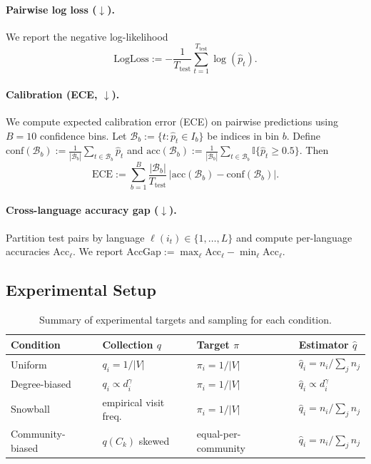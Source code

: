 \documentclass{article}
\theoremstyle{plain}
\theoremstyle{definition}
\theoremstyle{remark}
\begin{document}
\paragraph{Pairwise log loss ($\downarrow$).}
We report the negative log-likelihood
\begin{equation}
\mathrm{LogLoss} := -\frac{1}{T_{\text{test}}}\sum_{t=1}^{T_{\text{test}}}\log(\hat p_t).
\end{equation}

\paragraph{Calibration (ECE, $\downarrow$).}
We compute expected calibration error (ECE) on pairwise predictions using $B=10$
confidence bins. Let $\mathcal{B}_b:=\{t:\hat p_t\in I_b\}$ be indices in bin $b$.
Define $\mathrm{conf}(\mathcal{B}_b):=\frac{1}{|\mathcal{B}_b|}\sum_{t\in\mathcal{B}_b}\hat p_t$
and $\mathrm{acc}(\mathcal{B}_b):=\frac{1}{|\mathcal{B}_b|}\sum_{t\in\mathcal{B}_b}\mathbb{I}\{\hat p_t\ge 0.5\}$.
Then
\begin{equation}
\mathrm{ECE}:=\sum_{b=1}^B \frac{|\mathcal{B}_b|}{T_{\text{test}}}\,\big|\mathrm{acc}(\mathcal{B}_b)-\mathrm{conf}(\mathcal{B}_b)\big|.
\end{equation}

\paragraph{Cross-language accuracy gap ($\downarrow$).}
Partition test pairs by language $\ell(i_t)\in\{1,\dots,L\}$ and compute
per-language accuracies $\mathrm{Acc}_\ell$. We report $\mathrm{AccGap}:=\max_\ell \mathrm{Acc}_\ell-\min_\ell \mathrm{Acc}_\ell$.

\subsection{Experimental Setup}

\begin{table}[h]
\caption{Summary of experimental targets and sampling for each condition.}
\label{tab:exp-setup}
\centering
\small
\begin{tabular}{llll}
\toprule
\textbf{Condition} & \textbf{Collection $q$} & \textbf{Target $\pi$} & \textbf{Estimator $\hat q$} \\
\midrule
Uniform & $q_i = 1/|V|$ & $\pi_i = 1/|V|$ & $\hat q_i = n_i/\sum_j n_j$ \\
Degree-biased & $q_i \propto d_i^\gamma$ & $\pi_i = 1/|V|$ & $\hat q_i \propto d_i^\gamma$ \\
Snowball & empirical visit freq. & $\pi_i = 1/|V|$ & $\hat q_i = n_i/\sum_j n_j$ \\
Community-biased & $q(C_k)$ skewed & equal-per-community & $\hat q_i = n_i/\sum_j n_j$ \\
\bottomrule
\end{tabular}
\end{table}
\end{document}

